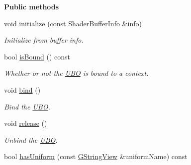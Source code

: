 \begin{Indent}\textbf{ Public methods}\par
\begin{DoxyCompactItemize}
\item 
\mbox{\label{classrev_1_1_u_b_o_a9a5c4c7f1879c1f87c620051e6413bf0}} 
void \mbox{\hyperlink{classrev_1_1_u_b_o_a9a5c4c7f1879c1f87c620051e6413bf0}{initialize}} (const \mbox{\hyperlink{structrev_1_1_shader_buffer_info}{Shader\+Buffer\+Info}} \&info)
\begin{DoxyCompactList}\small\item\em Initialize from buffer info. \end{DoxyCompactList}\item 
\mbox{\label{classrev_1_1_u_b_o_a7b12137b00c83334a1cf308c3ac54647}} 
bool \mbox{\hyperlink{classrev_1_1_u_b_o_a7b12137b00c83334a1cf308c3ac54647}{is\+Bound}} () const
\begin{DoxyCompactList}\small\item\em Whether or not the \mbox{\hyperlink{classrev_1_1_u_b_o}{U\+BO}} is bound to a context. \end{DoxyCompactList}\item 
\mbox{\label{classrev_1_1_u_b_o_afc983ea5962865c3ff52de51715107ba}} 
void \mbox{\hyperlink{classrev_1_1_u_b_o_afc983ea5962865c3ff52de51715107ba}{bind}} ()
\begin{DoxyCompactList}\small\item\em Bind the \mbox{\hyperlink{classrev_1_1_u_b_o}{U\+BO}}. \end{DoxyCompactList}\item 
\mbox{\label{classrev_1_1_u_b_o_a800aec357a633c0f0092c85705951cfe}} 
void \mbox{\hyperlink{classrev_1_1_u_b_o_a800aec357a633c0f0092c85705951cfe}{release}} ()
\begin{DoxyCompactList}\small\item\em Unbind the \mbox{\hyperlink{classrev_1_1_u_b_o}{U\+BO}}. \end{DoxyCompactList}\item 
\mbox{\label{classrev_1_1_u_b_o_acd080c97981e0d46a007feb9483f40a9}} 
bool \mbox{\hyperlink{classrev_1_1_u_b_o_acd080c97981e0d46a007feb9483f40a9}{has\+Uniform}} (const \mbox{\hyperlink{classrev_1_1_g_string_view}{G\+String\+View}} \&uniform\+Name) const

\end{DoxyCompactItemize}
\end{Indent}
